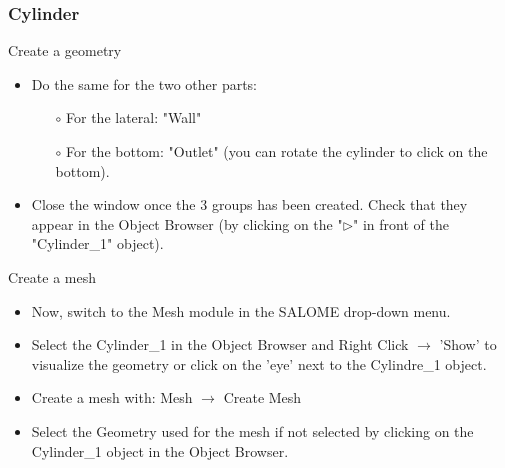 \documentclass[10pt, hyperref={unicode=true,pdfusetitle, bookmarks=true,bookmarksnumbered=false,bookmarksopen=false, breaklinks=false,pdfborder={0 0 1},backref=true,colorlinks=true,linkcolor=darkblue,pageanchor}]{beamer}
\begin{document}
\begin{frame}
\frametitle{Cylinder}

\begin{block}{Create a geometry}
\begin{itemize}
\item Do the same for the two other parts:
    \begin{itemize}
    \item [$\circ$] For the lateral: "Wall"
    \item [$\circ$] For the bottom: "Outlet" (you can rotate the cylinder to click on the bottom).
    \end{itemize}
\item Close the window once the 3 groups has been created. Check that they appear in the Object Browser (by clicking on the "$\triangleright$" in front of the "Cylinder\_1" object).
\end{itemize}
\end{block}

\begin{block}{Create a mesh}
\begin{itemize}
\item \label{salome_mesh} Now, switch to the Mesh module in the SALOME drop-down menu.
\item Select the Cylinder\_1 in the Object Browser and Right Click $\rightarrow$ 'Show' to visualize the geometry or click on the 'eye' next to the Cylindre\_1 object.
\item Create a mesh with: Mesh $\rightarrow$ Create Mesh
\item Select the Geometry used for the mesh if not selected by clicking on the Cylinder\_1 object in the Object Browser.
\end{itemize}
\end{block}

\end{frame}
\end{document}
